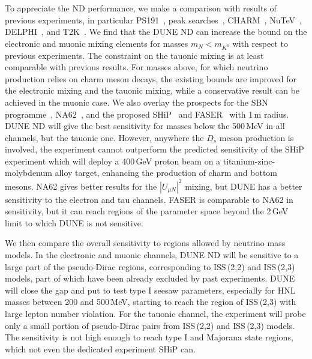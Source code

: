 To appreciate the ND performance, we make a comparison with results of previous experiments, %
in particular PS191~\cite{Bernardi:1985ny, Bernardi:1987ek}, peak searches~\cite{Artamonov:2014urb, Britton:1992pg, Britton:1992xv}, %
CHARM~\cite{Vilain:1994vg}, NuTeV~\cite{Vaitaitis:1999wq}, DELPHI~\cite{Abreu:1996pa}, and T2K~\cite{Abe:2019kgx}.
We find that the DUNE ND can increase the bound on the electronic and muonic mixing elements %
for masses $m_N < m_{K^0}$ with respect to previous experiments.
The constraint on the tauonic mixing is at least comparable with previous results.
For masses above, for which neutrino production relies on charm meson decays, the existing bounds %
are improved for the electronic mixing and the tauonic mixing, while a conservative result %
can be achieved in the muonic case.
We also overlay the prospects for the SBN programme~\cite{Ballett:2016opr}, %
NA62~\cite{Drewes:2018irr}, and the proposed SHiP~\cite{Alekhin:2015byh} and FASER~\cite{Kling:2018wct} with 1\,m radius.
DUNE ND will give the best sensitivity for masses below the 500\,MeV in all channels, but the tauonic one.
However, anywhere the $D_s$ meson production is involved, the experiment cannot outperform the predicted %
sensitivity of the SHiP experiment which will deploy a 400\,GeV proton beam on a titanium-zinc-molybdenum alloy %
target, enhancing the production of charm and bottom mesons.
NA62 gives better results for the $|U_{\mu N}|^2$ mixing, but DUNE has a better sensitivity %
to the electron and tau channels.
FASER is comparable to NA62 in sensitivity, but it can reach regions of the parameter space beyond the 2\,GeV limit %
to which DUNE is not sensitive.

We then compare the overall sensitivity to regions allowed by neutrino mass models.
In the electronic and muonic channels, DUNE ND will be sensitive to a large part of the pseudo-Dirac regions, %
corresponding to ISS\,(2,2) and ISS\,(2,3) models, %
part of which have been already excluded by past experiments.
DUNE will close the gap and put to test type I seesaw parameters, especially for HNL masses between 200 and 500\,MeV, %
starting to reach the region of ISS\,(2,3) with large lepton number violation.
For the tauonic channel, the experiment will probe only a small portion %
of pseudo-Dirac pairs from ISS\,(2,2) and ISS\,(2,3) models.
The sensitivity is not high enough to reach type I and Majorana state regions, which not even the dedicated experiment SHiP can.

